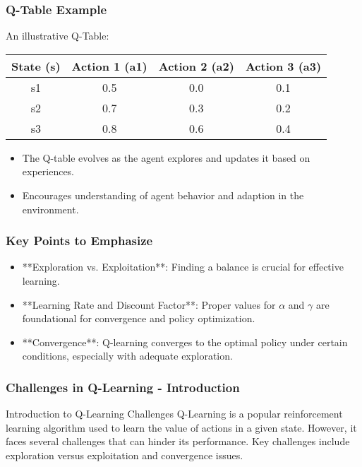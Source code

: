 \documentclass[aspectratio=169]{beamer}
\begin{document}
\begin{frame}[fragile]
    \frametitle{Q-Table Example}
    An illustrative Q-Table:
    \begin{center}
        \begin{tabular}{|c|c|c|c|}
            \hline
            State (s) & Action 1 (a1) & Action 2 (a2) & Action 3 (a3) \\
            \hline
            s1 & 0.5 & 0.0 & 0.1 \\
            s2 & 0.7 & 0.3 & 0.2 \\
            s3 & 0.8 & 0.6 & 0.4 \\
            \hline
        \end{tabular}
    \end{center}
    \begin{itemize}
        \item The Q-table evolves as the agent explores and updates it based on experiences.
        \item Encourages understanding of agent behavior and adaption in the environment.
    \end{itemize}
\end{frame}

\begin{frame}[fragile]
    \frametitle{Key Points to Emphasize}
    \begin{itemize}
        \item **Exploration vs. Exploitation**: Finding a balance is crucial for effective learning.
        \item **Learning Rate and Discount Factor**: Proper values for \( \alpha \) and \( \gamma \) are foundational for convergence and policy optimization.
        \item **Convergence**: Q-learning converges to the optimal policy under certain conditions, especially with adequate exploration.
    \end{itemize}
\end{frame}

\begin{frame}[fragile]
    \frametitle{Challenges in Q-Learning - Introduction}
    \begin{block}{Introduction to Q-Learning Challenges}
        Q-Learning is a popular reinforcement learning algorithm used to learn the value of actions in a given state. However, it faces several challenges that can hinder its performance. Key challenges include exploration versus exploitation and convergence issues.
    \end{block}
\end{frame}
\end{document}
